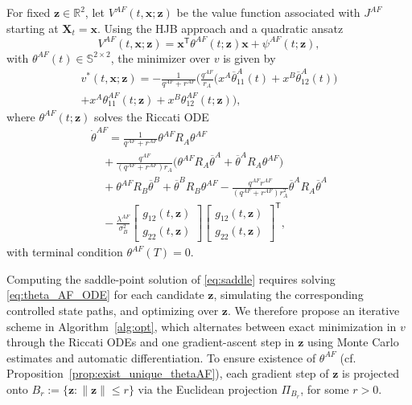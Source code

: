\documentclass[letterpaper, 10 pt, conference]{ieeeconf}
\newcommand{\R}{\mathbb R}
\newcommand{\transpose}{^\mathsf{T}}
\begin{document}
For fixed $\bm{z} \in \R^2$, let $V^{AF}(t,\bm x;\bm z)$ be the value function associated with $J^{AF}$ starting at $\bm X_t = \bm x$. Using the HJB approach and a quadratic ansatz 
\[
V^{AF}(t,\bm x;\bm z)
=
\bm x\transpose \theta^{AF}(t; \bm z)\bm x
+
\psi^{AF}(t; \bm z),\]
with $\theta^{AF}(t)\in\mathbb S^{2\times 2}$, the minimizer over $v$ is given by
\begin{multline}\label{eq:v_ast_z}
    v^\ast(t, \bm x; \bm{z}) = -\tfrac{1}{ q^{AF} +  r^{AF}}\Big( \tfrac{ q^{AF}}{r_A}\big(x^A \overline{\theta}_{11}^A(t) + x^B \overline{\theta}_{12}^A(t)\big)\\
    + x^A \theta_{11}^{AF}(t; \bm z) + x^B \theta_{12}^{AF}(t; \bm z)\Big),
\end{multline}
where $\theta^{AF}(t; \bm z)$ solves the Riccati ODE 
\begin{multline}\label{eq:theta_AF_ODE}
    \dot{\theta}^{AF} = \tfrac{1}{ q^{AF}+ r^{AF}}\theta^{AF} R_A \theta^{AF}\\ 
    \quad+ \tfrac{ q^{AF}}{( q^{AF}+ r^{AF})r_A}\big(\theta^{AF} R_A \overline{\theta}^A + \overline{\theta}^A R_A \theta^{AF}\big) \\
    \quad+ \theta^{AF} R_B \overline{\theta}^B + \overline{\theta}^B R_B \theta^{AF} - \tfrac{ q^{AF}  r^{AF}}{( q^{AF}+  r^{AF})r_A^2}\overline{\theta}^A R_A \overline{\theta}^A \\
    \quad - \tfrac{ \lambda^{AF}}{\sigma_B^2} \begin{bmatrix} g_{12}(t,\bm{z}) \\ g_{22}(t,\bm{z}) \end{bmatrix}\begin{bmatrix}  g_{12}(t,\bm{z}) \\ g_{22}(t,\bm{z}) \end{bmatrix}\transpose,
\end{multline}
with terminal condition $\theta^{AF}(T) = 0$.  %

Computing the saddle-point solution of \eqref{eq:saddle} requires solving \eqref{eq:theta_AF_ODE}  for each candidate $\bm{z}$, simulating the corresponding controlled state paths, and optimizing over $\bm{z}$.  
We therefore propose an iterative scheme in Algorithm~\ref{alg:opt}, which alternates between exact minimization in $v$ through the Riccati ODEs and one gradient-ascent step in $\bm{z}$ using Monte Carlo estimates and automatic differentiation.  To ensure existence of $\theta^{AF}$ (cf. Proposition~\ref{prop:exist_unique_thetaAF}), each gradient step of $\bm{z}$ is projected onto $B_r:=\{\bm{z}:\|\bm{z}\|\leq r\}$ via the Euclidean projection $\Pi_{B_r}$, for some $r>0$.
\end{document}
